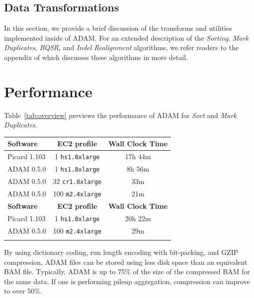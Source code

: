 \documentclass{bioinfo}
\begin{document}
\begin{methods}
\subsection{Data Transformations}
\label{sec:data-transformations}

In this section, we provide a brief discussion of the transforms and utilities implemented inside of ADAM. For an extended description of
the \textit{Sorting}, \textit{Mark Duplicates}, \textit{BQSR}, and \textit{Indel Realignment} algorithms, we refer readers to the appendix of
\citet{massie13} which discusses these algorithms in more detail.

\end{methods}

\section{Performance}
\label{sec:performance}

Table~\ref{tab:overview} previews the performance of ADAM for \textit{Sort} and \textit{Mark Duplicates}.

\begin{table}[h]
{\begin{tabular}{ l c c }
\toprule
\bf Software & \bf EC2 profile & \bf Wall Clock Time \\
\midrule
Picard 1.103 & 1 \texttt{hs1.8xlarge} & 17h 44m \\
ADAM 0.5.0 & 1 \texttt{hs1.8xlarge} & 8h 56m \\
ADAM 0.5.0 & 32 \texttt{cr1.8xlarge} & 33m \\
ADAM 0.5.0 & 100 \texttt{m2.4xlarge} & 21m \\ 
\midrule
\bf Software & \bf EC2 profile & \bf Wall Clock Time \\
\midrule
Picard 1.103 & 1 \texttt{hs1.8xlarge} & 20h 22m \\
ADAM 0.5.0 & 100 \texttt{m2.4xlarge} & 29m \\
\botrule
\end{tabular}}{}
\end{table}

By using dictionary coding, run length encoding with bit-packing, and GZIP compression, ADAM files can be stored using less
disk space than an equivalent BAM file. Typically, ADAM is up to 75\% of the size of the compressed BAM for the
same data. If one is performing pileup aggregation, compression can improve to over 50\%.
\end{document}

